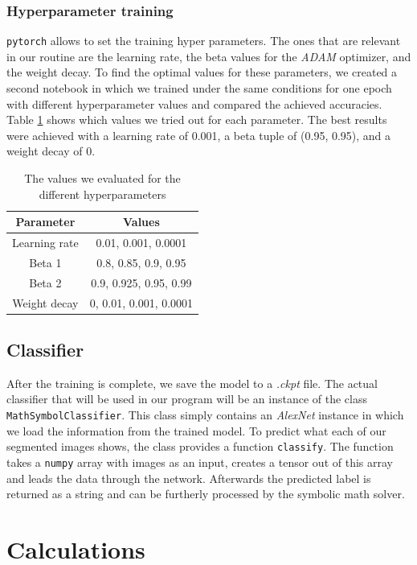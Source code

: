 \documentclass[12pt]{article}
\begin{document}
	\subsubsection{Hyperparameter training}
	\texttt{pytorch} allows to set the training hyper parameters. The ones that are relevant in our routine are the learning rate, the beta values for the \textit{ADAM} optimizer, and the weight decay. To find the optimal values for these parameters, we created a second notebook in which we trained under the same conditions for one epoch with different hyperparameter values and compared the achieved accuracies. Table \ref{tab:hyperparams} shows which values we tried out for each parameter. The best results were achieved with a learning rate of 0.001, a beta tuple of (0.95, 0.95), and a weight decay of 0.
	\begin{table}[h!]
		\begin{tabular}{c|c}
			\textbf{Parameter} & \textbf{Values} \\
			\hline
			Learning rate & 0.01, 0.001, 0.0001 \\
			Beta 1 & 0.8, 0.85, 0.9, 0.95 \\
			Beta 2 & 0.9, 0.925, 0.95, 0.99 \\
			Weight decay & 0, 0.01, 0.001, 0.0001
		\end{tabular}
		\caption{The values we evaluated for the different hyperparameters}
		\label{tab:hyperparams}
	\end{table}
	
	\subsection{Classifier}
	After the training is complete, we save the model to a \textit{.ckpt} file. The actual classifier that will be used in our program will be an instance of the class \texttt{MathSymbolClassifier}. This class simply contains an \textit{AlexNet} instance in which we load the information from the trained model. To predict what each of our segmented images shows, the class provides a function \texttt{classify}. The function takes a \texttt{numpy} array with images as an input, creates a tensor out of this array and leads the data through the network. Afterwards the predicted label is returned as a string and can be furtherly processed by the symbolic math solver.

\section{Calculations}
\end{document}
